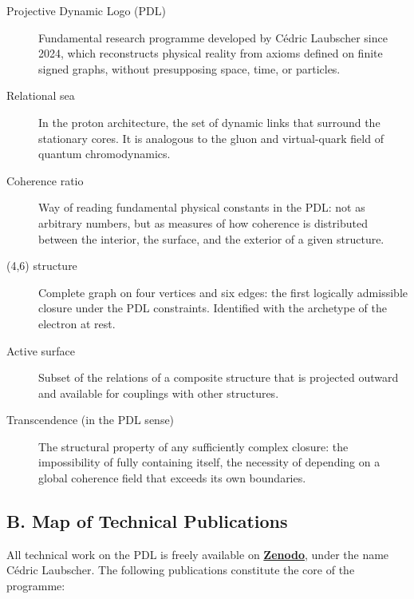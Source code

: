 \documentclass[11pt, a4paper, openright]{book}
\begin{document}
\begin{description}
\item[Projective Dynamic Logo (PDL)] Fundamental research programme developed by Cédric Laubscher since 2024, which reconstructs physical reality from axioms defined on finite signed graphs, without presupposing space, time, or particles.

\item[Relational sea] In the proton architecture, the set of dynamic links that surround the stationary cores. It is analogous to the gluon and virtual-quark field of quantum chromodynamics.

\item[Coherence ratio] Way of reading fundamental physical constants in the PDL: not as arbitrary numbers, but as measures of how coherence is distributed between the interior, the surface, and the exterior of a given structure.

\item[(4,6) structure] Complete graph on four vertices and six edges: the first logically admissible closure under the PDL constraints. Identified with the archetype of the electron at rest.

\item[Active surface] Subset of the relations of a composite structure that is projected outward and available for couplings with other structures.

\item[Transcendence (in the PDL sense)] The structural property of any sufficiently complex closure: the impossibility of fully containing itself, the necessity of depending on a global coherence field that exceeds its own boundaries.

\end{description}

\subsection*{B. Map of Technical Publications}

All technical work on the PDL is freely available on \href{https://zenodo.org}{\textbf{Zenodo}}, under the name Cédric Laubscher. The following publications constitute the core of the programme:
\end{document}
